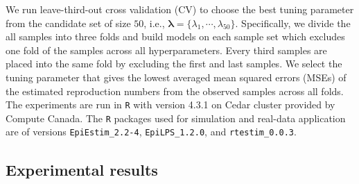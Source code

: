 We run leave-third-out cross validation (CV) to choose the best tuning parameter from the candidate set of size $50$, i.e., $\boldsymbol{\lambda} = \{\lambda_1, \cdots, \lambda_{50}\}$. Specifically, we divide the all samples into three folds and build models on each sample set which excludes one fold of the samples across all hyperparameters. Every third samples are placed into the same fold by excluding the first and last samples. We select the tuning parameter that gives the lowest averaged mean squared errors (MSEs) of the estimated reproduction numbers from the observed samples across all folds. 
The experiments are run in \texttt{R} with version 4.3.1 on Cedar cluster provided by Compute Canada. The \texttt{R} packages used for simulation and real-data application are of versions \texttt{EpiEstim\_2.2-4}, \texttt{EpiLPS\_1.2.0}, and \texttt{rtestim\_0.0.3}. 

\subsection{Experimental results}

